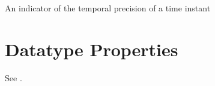 \documentclass[letterpaper,10pt,english]{sphinxmanual}
\begin{document}
\begin{sphinxShadowBox}

\sphinxAtStartPar
{}
\end{sphinxShadowBox}

\begin{sphinxShadowBox}

\sphinxAtStartPar
An indicator of the temporal precision of a time instant
\end{sphinxShadowBox}

\begin{sphinxShadowBox}

\sphinxAtStartPar
{}
\end{sphinxShadowBox}


\chapter{Datatype Properties}
\label{\detokenize{datatype-properties:datatype-properties}}\label{\detokenize{datatype-properties::doc}}
\sphinxAtStartPar
See {\hyperref[\detokenize{datatype-properties:table-8}]{}}.
\end{document}
